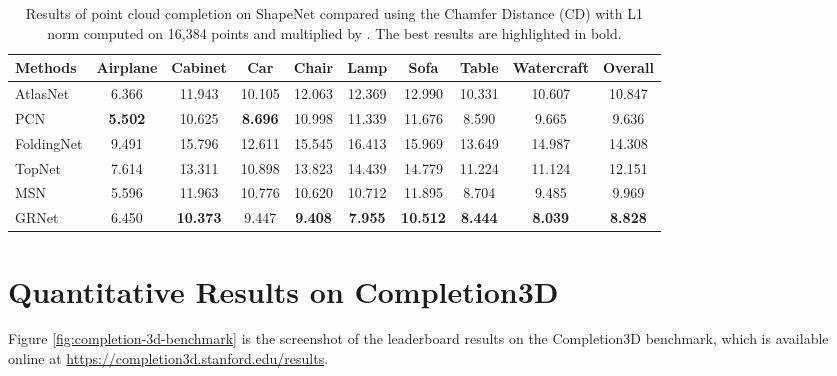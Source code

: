 \documentclass[runningheads]{llncs}
\begin{document}
\begin{table*}[!t]
  \caption{Results of point cloud completion on ShapeNet compared using the Chamfer Distance (CD) with L1 norm computed on 16,384 points and multiplied by . The best results are highlighted in bold.}
  \begin{tabularx}{1.03\linewidth}{l|cccccccc|c}
    \toprule
    Methods      & Airplane   & Cabinet     & Car        & Chair 
                 & Lamp       & Sofa        & Table      & Watercraft 
                 & Overall \\
    \midrule  
    AtlasNet \cite{DBLP:conf/cvpr/GroueixFKRA18}    
                 & 6.366      & 11.943      & 10.105     & 12.063
                 & 12.369     & 12.990      & 10.331     & 10.607
                 & 10.847 \\ 
    PCN \cite{DBLP:conf/ThreeDim/YuanKHMH18}
                 & \bf{5.502} & 10.625      & \bf{8.696} & 10.998 
                 & 11.339     & 11.676      & 8.590      & 9.665
                 & 9.636 \\
    FoldingNet \cite{DBLP:conf/cvpr/YangFST18}
                 & 9.491      & 15.796      & 12.611     & 15.545
                 & 16.413     & 15.969      & 13.649     & 14.987
                 & 14.308 \\
    TopNet \cite{DBLP:conf/cvpr/TchapmiKR0S19}
                 & 7.614      & 13.311      & 10.898     & 13.823
                 & 14.439     & 14.779      & 11.224     & 11.124
                 & 12.151 \\
    MSN \cite{DBLP:conf/aaai/LiuSYSH20}
                 & 5.596      & 11.963      & 10.776     & 10.620
                 & 10.712     & 11.895      & 8.704      & 9.485
                 & 9.969 \\
    GRNet        & 6.450      & \bf{10.373} & 9.447      & \bf{9.408}
                 & \bf{7.955} & \bf{10.512} & \bf{8.444} & \bf{8.039}
                 & \bf{8.828} \\
  	\bottomrule
  \end{tabularx}
  \label{tab:shapenet-reconstruction}
\end{table*}

\section{Quantitative Results on Completion3D}
\label{sec:completion3d-quantitative-results}

Figure \ref{fig:completion-3d-benchmark} is the screenshot of the leaderboard results on the Completion3D benchmark, which is available online at \url{https://completion3d.stanford.edu/results}.
\end{document}
